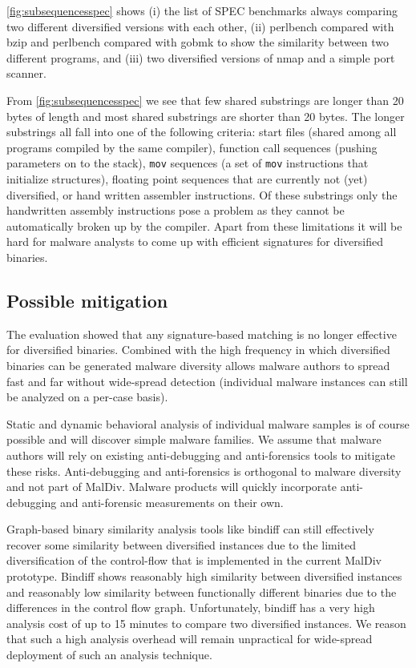 \documentclass[10pt, preprint]{sigplanconf}
\begin{document}
\autoref{fig:subsequencesspec} shows (i) the list of SPEC benchmarks always
comparing two different diversified versions with each other, (ii) perlbench
compared with bzip and perlbench compared with gobmk to show the similarity
between two different programs, and (iii) two diversified versions of nmap and a
simple port scanner.

From \autoref{fig:subsequencesspec} we see that few shared substrings are longer
than 20 bytes of length and most shared substrings are shorter than 20 bytes.
The longer substrings all fall into one of the following criteria: start files
(shared among all programs compiled by the same compiler), function call
sequences (pushing parameters on to the stack), \texttt{mov} sequences (a set of
\texttt{mov} instructions that initialize structures), floating point sequences
that are currently not (yet) diversified, or hand written assembler
instructions. Of these substrings only the handwritten assembly instructions
pose a problem as they cannot be automatically broken up by the compiler. Apart
from these limitations it will be hard for malware analysts to come up with
efficient signatures for diversified binaries.


\subsection{Possible mitigation}

The evaluation showed that any signature-based matching is no longer effective
for diversified binaries. Combined with the high frequency in which diversified
binaries can be generated malware diversity allows malware authors to spread
fast and far without wide-spread detection (individual malware instances can
still be analyzed on a per-case basis).

Static and dynamic behavioral analysis of individual malware samples is of
course possible and will discover simple malware families. We assume that
malware authors will rely on existing anti-debugging and anti-forensics tools
to mitigate these risks. Anti-debugging and anti-forensics is orthogonal to
malware diversity and not part of MalDiv. Malware products will quickly
incorporate anti-debugging and anti-forensic measurements on their own.

Graph-based binary similarity analysis tools like bindiff can still effectively
recover some similarity between diversified instances due to the limited
diversification of the control-flow that is implemented in the current MalDiv
prototype. Bindiff shows reasonably high similarity between diversified
instances and reasonably low similarity between functionally different
binaries due to the differences in the control flow graph. Unfortunately,
bindiff has a very high analysis cost of up to 15 minutes to compare two
diversified instances. We reason that such a high analysis overhead will remain
unpractical for wide-spread deployment of such an analysis technique.
\end{document}
